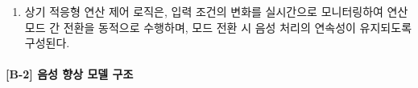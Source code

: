 \documentclass{article}
\begin{document}
\begin{enumerate}[label = \textbf{(B.1.\arabic*)}]
    상기 외부 소음도는 공기전도 마이크로폰 채널의 단시간 RMS 또는 등가 음압 레벨(Leq)에 기초하여 산출될 수 있으며, 공기전도 채널 포화 시에는 포화 마스크 활성 비율 또는 별도 음압 센서의 측정값을 보조 지표로 활용할 수 있다.

    상기 모드 전환에는 채터링 방지를 위한 히스테리시스가 적용되며, 일 실시예에서 제2 모드에서 제1 모드로의 복귀 시 외부 소음도 기준을 110\,dB\,SPL 미만, 포화 마스크 활성 비율을 5\% 미만으로 설정한다. 상기 각 임계값은 운용 환경에 따라 조정 가능한 설계 파라미터이며, 구체적인 상태 전이 조건 및 전환 절차는 후술하는 적응형 연산 제어 실시예에서 상세히 기술한다.

    \item 상기 적응형 연산 제어 로직은, 입력 조건의 변화를 실시간으로
    모니터링하여 연산 모드 간 전환을 동적으로 수행하며, 모드 전환 시
    음성 처리의 연속성이 유지되도록 구성된다.

\end{enumerate}


\paragraph{[B-2] 음성 향상 모델 구조}
\end{document}
